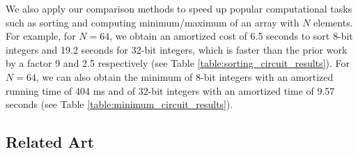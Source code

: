 We also apply our comparison methods to speed up popular computational tasks such as sorting and computing minimum/maximum of an array with $N$ elements. 
For example, for $N=64$, we obtain an amortized cost of 6.5 seconds to sort 8-bit integers and 19.2 seconds for 32-bit integers, which is faster than the prior work by a factor 9 and 2.5 respectively (see Table \ref{table:sorting_circuit_results}). 
For $N=64$, we can also obtain the minimum of 8-bit integers with an amortized running time of 404 ms and of 32-bit integers with an amortized time of 9.57 seconds (see Table \ref{table:minimum_circuit_results}).

\subsection{Related Art}
\label{sec:related-art}





